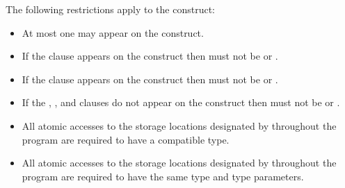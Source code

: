 \begin{samepage}


\restrictions

The following restrictions apply to the  construct:

\begin{itemize}
\item At most one  may appear on the construct.

\item If the  clause appears on the construct then
 must not be  or .

\item If the  clause appears on the construct then
 must not be  or .

\item If the , , and  clauses do not
appear on the construct then  must not be 
or .
\end{itemize}

\begin{ccppspecific}
\begin{itemize}
\item All atomic accesses to the storage locations designated by  throughout the program 
are required to have a compatible type. 
\end{itemize}
\end{ccppspecific}
\end{samepage}

\begin{fortranspecific}
\begin{itemize}
\item All atomic accesses to the storage locations designated by  throughout the program 
are required to have the same type and type parameters. 
\end{itemize}
\end{fortranspecific}


